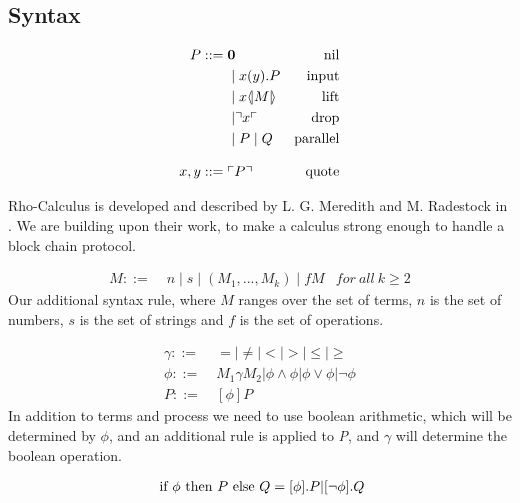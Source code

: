 \subsection{Syntax}
\begin{align*}
    P  ::= \; &  \mathbf{0} & \text{nil} \\
      & \mid x(y).P & \text{input} \\
      & \mid x \langle \! | M | \! \rangle & \text{lift} \\
      & \mid \urcorner x \ulcorner & \text{drop} \\
      & \mid P \mid Q & \text{parallel} \\[3mm]
    x,y ::= \; & \ulcorner P \urcorner & \text{quote}\\
\end{align*}

Rho-Calculus is developed and described by L. G. Meredith and M. Radestock in \citep{Meredith2005}. We are building upon their work, to make a calculus strong enough to handle a block chain protocol.

\begin{align*}
M::=\; & n \mid s \mid (M_1,...,M_k) \mid fM &for\ all\ k \geq 2
\end{align*}
Our additional syntax rule, where $M$ ranges over the set of terms, $n$ is the set of numbers, $s$ is the set of strings and $f$ is the set of operations.

\begin{align*}
\gamma ::=& \ =|\neq|<|>|\leq|\geq\\
\phi ::=& \ M_1\gamma M_2|\phi\land\phi|\phi\lor\phi|\neg\phi\\
P::=& \ [\phi] P
\end{align*}
In addition to terms and process we need to use boolean arithmetic, which will be determined by \ensuremath{\phi}, and an additional rule is applied to \textit{P}, and \ensuremath{\gamma} will determine the boolean operation.

\begin{align*}
	\text{ if }\phi\text{ then }P\text{ else }Q = [\phi].P | [\neg \phi].Q
\end{align*}
